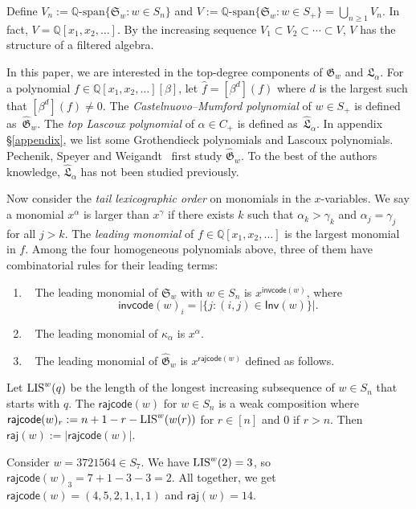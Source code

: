\documentclass[ALCO]{cedram}
\newcommand{\fG}{\mathfrak{G}}
\newcommand{\fGb}{\fG}
\newcommand{\fL}{\mathfrak{L}}
\newcommand{\fLb}{\fL}
\newcommand{\topLas}{\widehat{\fL}}
\newcommand{\topGro}{\widehat{\fG}}
\newcommand{\fS}{\mathfrak{S}}
\newcommand{\Q}{\mathbb{Q}}
\newcommand{\rajcode}{\mathsf{rajcode}}
\newcommand{\raj}{\mathsf{raj}}
\newcommand{\Inv}{\mathsf{Inv}}
\newcommand{\invcode}{\mathsf{invcode}}
\newcommand{\definition}[1]{{\color{darkred}\emph{#1}}}
\begin{document}
Define $V_n :=  \Q\textrm{-span}\{\fS_w: w \in S_n\}$ 
and $V :=  \Q\textrm{-span}\{\fS_w: w \in S_+\} = \bigcup_{n \geq 1} V_n$.
In fact, $V = \mathbb{Q}[x_1, x_2, \dots]$. 
By the increasing sequence 
$V_1 \subset V_2 \subset \cdots \subset V$,
$V$ has the structure of a filtered algebra. 


In this paper, we are interested in the top-degree 
components of $\fGb_w$ and $\fLb_\alpha$. 
For a polynomial $f \in \mathbb{Q}[x_1, x_2, \dots][\beta]$,
let $\widehat{f} = [\beta^d](f)$ where $d$ is the largest such that 
$[\beta^d](f) \neq 0$.
The \definition{Castelnuovo--Mumford polynomial} of $w \in S_+$
is defined as~$\topGro_w$.
The \definition{top Lascoux polynomial} of $\alpha \in C_+$
is defined as~$\topLas_\alpha$. In appendix \S\ref{appendix}, we list some Grothendieck polynomials and Lascoux polynomials.
Pechenik, Speyer and Weigandt~\cite{PSW} first study $\topGro_w$.
To the best of the authors knowledge, 
$\topLas_\alpha$ has not been studied previously. 

Now consider the \definition{tail lexicographic order} 
on monomials in the $x$-variables.
We say a monomial $x^\alpha$ is larger than $x^\gamma$
if there exists $k$ such that $\alpha_k > \gamma_k$ and 
$\alpha_j = \gamma_j$ for all $j > k$.
The \definition{leading monomial} of $f \in \Q[x_1, x_2, \dots]$
is the largest monomial in $f$. 
Among the four homogeneous
polynomials above,
three of them have combinatorial rules for their leading terms:
\begin{enumerate}
\item~\cite{BJS} The leading monomial of $\fS_w$ with $w \in S_n$
is $x^{\invcode(w)}$,
where $$\invcode(w)_i = |\{j: (i,j) \in \Inv(w)\}|.$$
\item~\cite{LS2} The leading monomial of $\kappa_\alpha$ is $x^\alpha$.
\item~\cite{PSW} The leading monomial of $\topGro_w$
is $x^{\rajcode(w)}$ defined as follows.
\end{enumerate}

\begin{defn}\cite{PSW}
\label{D: raj on permutations}
Let $\textup{LIS}^w(q)$ be the 
length of the longest increasing subsequence 
of $w\in S_n$ that starts with $q$.
The $\rajcode(w)$ for $w\in S_n$ is a weak composition
where 
$\rajcode(w)_r := n + 1 - r - \textup{LIS}^w(w(r))$ for $r \in [n]$
and $0$ if $r > n$.
Then $\raj(w) := |\rajcode(w)|$.
\end{defn}


\begin{exa}
\label{E: rajcode permutation}
Consider $w = 3721564 \in S_7$. We have $\textup{LIS}^w(2) = 3$, 
so $\rajcode(w)_3 = 7 + 1 - 3 - 3 = 2$.
All together,
we get $\rajcode(w) = (4,5,2,1,1,1)$ and $\raj(w) = 14$.
\end{exa}
\end{document}
